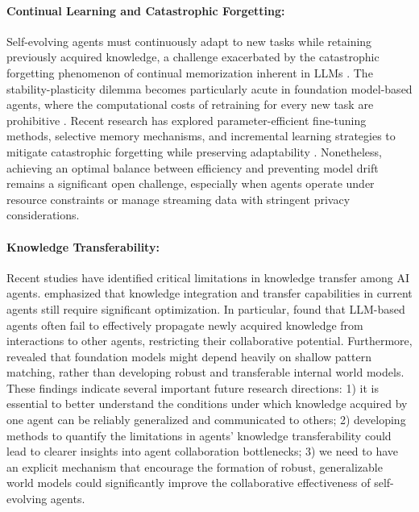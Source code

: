 \documentclass[10pt]{article} %
\begin{document}
\paragraph{Continual Learning and Catastrophic Forgetting:} Self-evolving agents must continuously adapt to new tasks while retaining previously acquired knowledge, a challenge exacerbated by the catastrophic forgetting phenomenon \citep{ghosal2024understanding} of continual memorization \citep{chen2024continual} inherent in LLMs \citep{bell2025future}. The stability-plasticity dilemma becomes particularly acute in foundation model-based agents, where the computational costs of retraining for every new task are prohibitive \citep{zheng2025lifelong}. Recent research has explored parameter-efficient fine-tuning methods, selective memory mechanisms, and incremental learning strategies to mitigate catastrophic forgetting while preserving adaptability \citep{wang2024comprehensive}. Nonetheless, achieving an optimal balance between efficiency and preventing model drift remains a significant open challenge, especially when agents operate under resource constraints or manage streaming data with stringent privacy considerations.

\paragraph{Knowledge Transferability:}
Recent studies have identified critical limitations in knowledge transfer among AI agents. \cite{shi2025models} emphasized that knowledge integration and transfer capabilities in current agents still require significant optimization. In particular, \cite{geng2025large} found that LLM-based agents often fail to effectively propagate newly acquired knowledge from interactions to other agents, restricting their collaborative potential. Furthermore, \cite{vafa2025has} revealed that foundation models might depend heavily on shallow pattern matching, rather than developing robust and transferable internal world models. These findings indicate several important future research directions: 1) it is essential to better understand the conditions under which knowledge acquired by one agent can be reliably generalized and communicated to others; 2) developing methods to quantify the limitations in agents' knowledge transferability could lead to clearer insights into agent collaboration bottlenecks; 3) we need to have an explicit mechanism that encourage the formation of robust, generalizable world models could significantly improve the collaborative effectiveness of self-evolving agents. 
\end{document}
